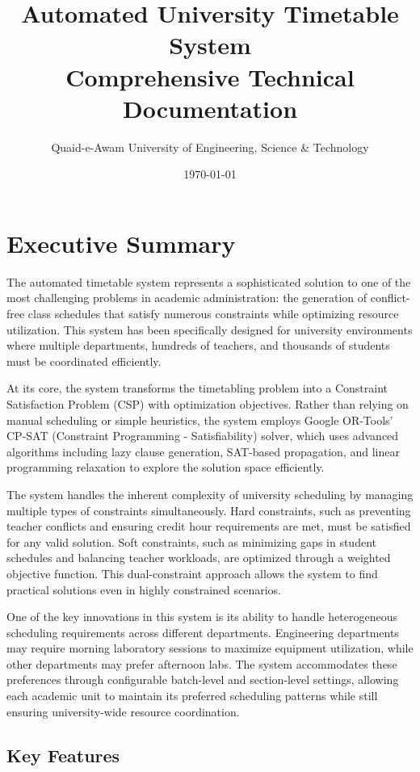 \documentclass[12pt,a4paper]{article}
\title{\textbf{Automated University Timetable System}\\
\large Comprehensive Technical Documentation}
\author{Quaid-e-Awam University of Engineering, Science \& Technology}
\date{\today}
\begin{document}
\maketitle
\tableofcontents
\newpage

\section{Executive Summary}

The automated timetable system represents a sophisticated solution to one of the most challenging problems in academic administration: the generation of conflict-free class schedules that satisfy numerous constraints while optimizing resource utilization. This system has been specifically designed for university environments where multiple departments, hundreds of teachers, and thousands of students must be coordinated efficiently.

At its core, the system transforms the timetabling problem into a Constraint Satisfaction Problem (CSP) with optimization objectives. Rather than relying on manual scheduling or simple heuristics, the system employs Google OR-Tools' CP-SAT (Constraint Programming - Satisfiability) solver, which uses advanced algorithms including lazy clause generation, SAT-based propagation, and linear programming relaxation to explore the solution space efficiently.

The system handles the inherent complexity of university scheduling by managing multiple types of constraints simultaneously. Hard constraints, such as preventing teacher conflicts and ensuring credit hour requirements are met, must be satisfied for any valid solution. Soft constraints, such as minimizing gaps in student schedules and balancing teacher workloads, are optimized through a weighted objective function. This dual-constraint approach allows the system to find practical solutions even in highly constrained scenarios.

One of the key innovations in this system is its ability to handle heterogeneous scheduling requirements across different departments. Engineering departments may require morning laboratory sessions to maximize equipment utilization, while other departments may prefer afternoon labs. The system accommodates these preferences through configurable batch-level and section-level settings, allowing each academic unit to maintain its preferred scheduling patterns while still ensuring university-wide resource coordination.

\subsection{Key Features}
\end{document}
